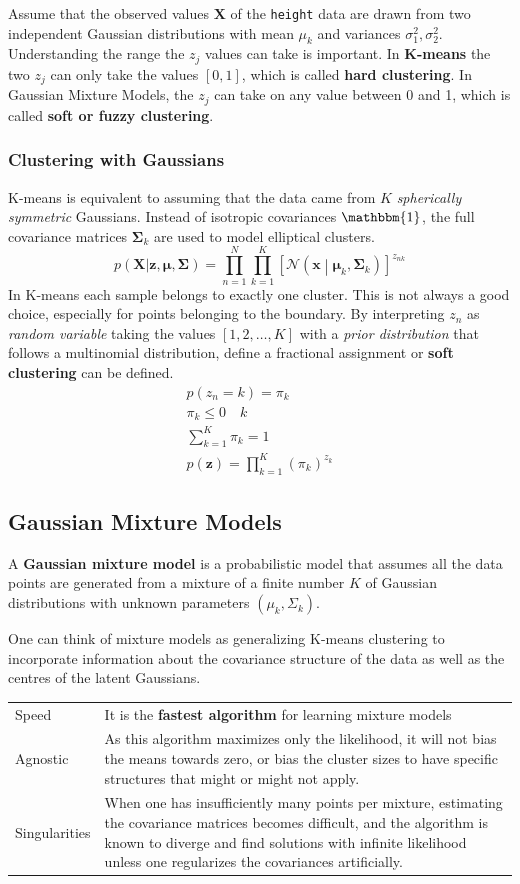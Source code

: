 \documentclass[11pt]{article}
\theoremstyle{definition}
\newcommand*\N[1]{\mathcal{N}\left(#1\right)}
\newcommand*\isocov{\ensuremath{\mathbbm{1}}}
\begin{document}
Assume that the observed values $\textbf{X}$ of the \texttt{height} data are drawn from two independent Gaussian distributions with mean $\mu_k$ and variances $\sigma_1^2, \sigma_2^2$. Understanding the range the $z_j$ values can take is important. In \textbf{K-means} the two $z_j$ can only take the values $[0,1]$, which is called \textbf{hard clustering}. In Gaussian Mixture Models, the $z_j$ can take on any value between 0 and 1, which is called \textbf{soft or fuzzy clustering}.

\subsubsection{Clustering with Gaussians}
K-means is equivalent to assuming that the data came from $K$ \emph{spherically symmetric} Gaussians. Instead of isotropic covariances $\isocov$, the full covariance matrices $\bm{\Sigma}_k$ are used to model elliptical clusters.
\begin{equation*}
	p(\textbf{X}|\textbf{z},\bm{\mu},\bm{\Sigma}) = \prod_{n=1}^{N}\prod_{k=1}^{K}\left[\N{\textbf{x}\middle| \bm{\mu}_k,\bm{\Sigma}_k}\right]^{z_{nk}}
\end{equation*}
In K-means each sample belongs to exactly one cluster. This is not always a good choice, especially for points belonging to the boundary. By interpreting $z_n$ as \emph{random variable} taking the values $[1,2,\dots,K]$ with a \emph{prior distribution} that follows a multinomial distribution, define a fractional assignment or \textbf{soft clustering} can be defined.
\begin{align*}
	p(z_n = k) = \pi_k\\
	\pi_k \leq 0\quad k\\
	\sum_{k=1}^{K}\pi_k = 1\\
	p(\textbf{z}) = \prod_{k=1}^{K} (\pi_k)^{z_k}
\end{align*}

\subsection{Gaussian Mixture Models}
A \textbf{Gaussian mixture model} is a probabilistic model that assumes all the data points are generated from a mixture of a finite number $K$ of Gaussian distributions with unknown parameters $(\mu_k, \Sigma_k)$.

One can think of mixture models as generalizing K-means clustering to incorporate information about the covariance structure of the data as well as the centres of the latent Gaussians.
\begin{tabularx}{\linewidth}{m{2cm} X}
	Speed & It is the \textbf{fastest algorithm} for learning mixture models \\
	Agnostic & As this algorithm maximizes only the likelihood, it will not bias the means towards zero, or bias the cluster sizes to have specific structures that might or might not apply. \\
	Singularities & When one has insufficiently many points per mixture, estimating the covariance matrices becomes difficult, and the algorithm is known to diverge and find solutions with infinite likelihood unless one regularizes the covariances artificially.
\end{tabularx}
\end{document}
